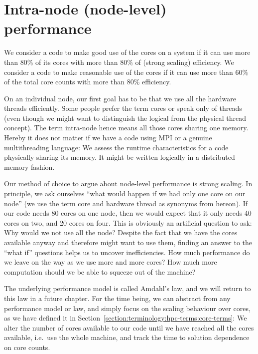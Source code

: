 \section{Intra-node (node-level) performance}
\label{section:high-level:intra-node}

\begin{summary}
 We consider a code to make good use of the cores on a system if it can use more than 80\% of its cores with more than 80\% of (strong scaling) efficiency.
 We consider a code to make reasonable use of the cores if it can use more than 60\% of the total core counts with more than 80\% efficiency.
\end{summary}


On an individual node, our first goal has to be that we use all the hardware threads efficiently.
Some people prefer the term cores or speak only of threads (even though we might want to distinguish the logical from the physical thread concept).
The term intra-node hence means all those cores sharing one memory.
Hereby it does not matter if we have a code using MPI or a genuine multithreading language:
We assess the runtime characteristics for a code physically sharing its memory.
It might be written logically in a distributed memory fashion.


Our method of choice to argue about node-level performance is strong scaling.
In principle, we ask ourselves ``what would happen if we had only one core on our
node'' (we use the term core and hardware thread as synonyms from hereon).
If our code needs 80 cores on one node, then we would expect that it only needs 40 cores
on two, and 20 cores on four.
This is obviously an artificial question to ask:
Why would we not use all the node? 
Despite the fact that we have the cores available anyway and therefore might want to use
them, finding an answer to the ``what if'' questions helps us to uncover
inefficiencies.
How much performance do we leave on the way as we use more and more cores?
How much more computation should we be able to squeeze out of the machine?


The underlying performance model is called Amdahl's law, and we will return to
this law in a future chapter. %
For the time being, we can abstract from any performance model or law, and
simply focus on the scaling behaviour over cores, as we have defined it in
Section~\ref{section:terminology:hpc-terms:core-terms}:
We alter the number of cores available to our code until we have reached all the
cores available, i.e.~use the whole machine, and track the time to solution
dependence on core counts.



